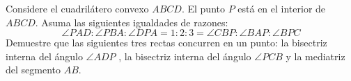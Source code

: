 Considere el cuadrilátero convexo $ABCD$. El punto $P$ está en el interior de $ABCD$. Asuma las siguientes igualdades de razones:
\[\angle PAD:\angle PBA:\angle DPA=1:2:3=\angle CBP:\angle BAP:\angle BPC\]
Demuestre que las siguientes tres rectas concurren en un punto: la bisectriz interna del ángulo 
$\angle ADP$ ,
la bisectriz interna del ángulo $\angle PCB$ y la mediatriz del segmento $AB$.